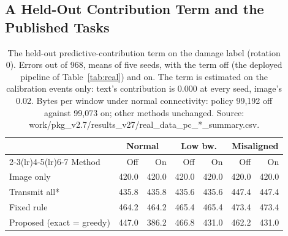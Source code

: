 \documentclass[conference,a4paper]{IEEEtran}
\newif\ifsubmission
\newcommand{\masteronly}[1]{\ifsubmission\else#1\fi}
\begin{document}
\subsection{A Held-Out Contribution Term and the Published Tasks}
\label{sec:pcterm}
\masteronly{%
\begin{table}[t]
\caption{The held-out predictive-contribution term on the damage label (rotation 0). Errors out of 968, means of five seeds, with the term off (the deployed pipeline of Table~\ref{tab:real}) and on. The term is estimated on the calibration events only: text's contribution is 0.000 at every seed, image's 0.02. Bytes per window under normal connectivity: policy 99,192 off against 99,073 on; other methods unchanged. Source: work/pkg\_v2.7/results\_v27/real\_data\_pc\_*\_summary.csv.}
\label{tab:pcterm}
\centering\scriptsize\setlength{\tabcolsep}{4pt}
\begin{tabular}{@{}lrrrrrr@{}}
\toprule
& \multicolumn{2}{c}{Normal} & \multicolumn{2}{c}{Low bw.} & \multicolumn{2}{c}{Misaligned} \\
\cmidrule(lr){2-3}\cmidrule(lr){4-5}\cmidrule(lr){6-7}
Method & Off & On & Off & On & Off & On \\
\midrule
Image only & 420.0 & 420.0 & 420.0 & 420.0 & 420.0 & 420.0 \\
Transmit all* & 435.8 & 435.8 & 435.6 & 435.6 & 447.4 & 447.4 \\
Fixed rule & 464.2 & 464.2 & 465.4 & 465.4 & 473.4 & 473.4 \\
Proposed (exact = greedy) & 447.0 & 386.2 & 466.8 & 431.0 & 462.2 & 431.0 \\
\bottomrule
\end{tabular}
\end{table}}%
\end{document}
